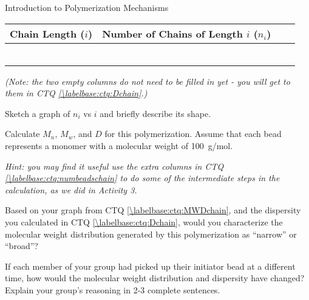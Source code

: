 \begin{activity}{Introduction to Polymerization Mechanisms}
\begin{ctqs}
		\begin{center}
		\renewcommand{\arraystretch}{2}
			\begin{tabular}{|c|c|c|c|}
				\hline
				\textbf{Chain Length ($i$)} & \textbf{Number of Chains of Length $i$ ($n_i$)} & \hspace{0.75in} & \hspace{0.75in} \\\hline
				&&&\\\hline
				&&&\\\hline
				&&&\\\hline
				&&&\\\hline
				&&&\\\hline
				&&&\\\hline
			\end{tabular}
		\end{center}
		
		\emph{(Note: the two empty columns do not need to be filled in yet - you will get to them in CTQ \ref{\labelbase:ctq:Dchain}.)}
		
	\question Sketch a graph of $n_i$ vs $i$ and briefly describe its shape. \label{\labelbase:ctq:MWDchain}
	
		\begin{solution}[2.75in]
		\end{solution}
	
	\question Calculate $M_n$, $M_w$, and $D$ for this polymerization.  Assume that each bead represents a monomer with a molecular weight of 100~g/mol. \label{\labelbase:ctq:Dchain}
	
		\emph{Hint: you may find it useful use the extra columns in CTQ \ref{\labelbase:ctq:numbeadschain} to do some of the intermediate steps in the calculation, as we did in Activity 3.}
	
		\begin{solution}[2.75in]
		\end{solution}
	
	\question Based on your graph from CTQ \ref{\labelbase:ctq:MWDchain}, and the dispersity you calculated in CTQ \ref{\labelbase:ctq:Dchain}, would you characterize the molecular weight distribution generated by this polymerization as ``narrow'' or ``broad''?  %
	
		\begin{solution}[1in]
		\end{solution}
	
	\question If each member of your group had picked up their initiator bead at a different time, how would the molecular weight distribution and dispersity have changed?  Explain your group's reasoning in 2-3 complete sentences.
	

\end{ctqs}
\end{activity}

